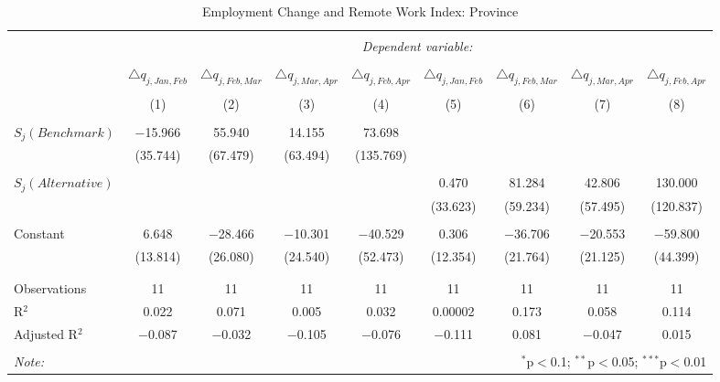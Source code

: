 
\begin{table}[!htbp] \centering 
  \caption{Employment Change and Remote Work Index: Province} 
  \label{tab:regression_dynamics_province} 
\footnotesize 
\begin{tabular}{@{\extracolsep{5pt}}lcccccccc} 
\\[-1.8ex]\hline 
\hline \\[-1.8ex] 
 & \multicolumn{8}{c}{\textit{Dependent variable:}} \\ 
\cline{2-9} 
\\[-1.8ex] & $\triangle q_{j,Jan,Feb}$ & $\triangle q_{j,Feb,Mar}$ & $\triangle q_{j,Mar,Apr}$ & $\triangle q_{j,Feb,Apr}$ & $\triangle q_{j,Jan,Feb}$ & $\triangle q_{j,Feb,Mar}$ & $\triangle q_{j,Mar,Apr}$ & $\triangle q_{j,Feb,Apr}$ \\ 
\\[-1.8ex] & (1) & (2) & (3) & (4) & (5) & (6) & (7) & (8)\\ 
\hline \\[-1.8ex] 
 $S_{j}(Benchmark)$ & $-$15.966 & 55.940 & 14.155 & 73.698 &  &  &  &  \\ 
  & (35.744) & (67.479) & (63.494) & (135.769) &  &  &  &  \\ 
  & & & & & & & & \\ 
 $S_{j}(Alternative)$ &  &  &  &  & 0.470 & 81.284 & 42.806 & 130.000 \\ 
  &  &  &  &  & (33.623) & (59.234) & (57.495) & (120.837) \\ 
  & & & & & & & & \\ 
 Constant & 6.648 & $-$28.466 & $-$10.301 & $-$40.529 & 0.306 & $-$36.706 & $-$20.553 & $-$59.800 \\ 
  & (13.814) & (26.080) & (24.540) & (52.473) & (12.354) & (21.764) & (21.125) & (44.399) \\ 
  & & & & & & & & \\ 
\hline \\[-1.8ex] 
Observations & 11 & 11 & 11 & 11 & 11 & 11 & 11 & 11 \\ 
R$^{2}$ & 0.022 & 0.071 & 0.005 & 0.032 & 0.00002 & 0.173 & 0.058 & 0.114 \\ 
Adjusted R$^{2}$ & $-$0.087 & $-$0.032 & $-$0.105 & $-$0.076 & $-$0.111 & 0.081 & $-$0.047 & 0.015 \\ 
\hline 
\hline \\[-1.8ex] 
\textit{Note:}  & \multicolumn{8}{r}{$^{*}$p$<$0.1; $^{**}$p$<$0.05; $^{***}$p$<$0.01} \\ 
\end{tabular} 
\end{table} 
